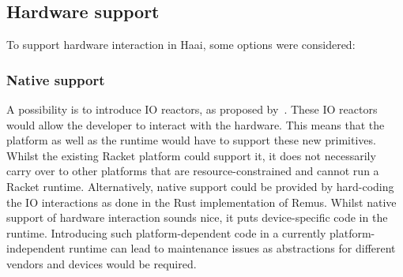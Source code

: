 \documentclass[a4paper]{book}
\begin{document}
\subsection{Hardware support}
\label{sec:hardware-support}
To support hardware interaction in Haai, some options were considered:
\subsubsection{Native support}
A possibility is to introduce IO reactors, as proposed
by~\textcite{oeyen2024reactive}. These IO reactors would allow the developer to
interact with the hardware. This means that the platform as well as the runtime
would have to support these new primitives. Whilst the existing Racket platform
could support it, it does not necessarily carry over to other platforms that are
resource-constrained and cannot run a Racket runtime. Alternatively, native
support could be provided by hard-coding the IO interactions as done in the Rust implementation of Remus.
Whilst native support of hardware interaction sounds nice, it puts
device-specific code in the runtime. Introducing such platform-dependent code in
a currently platform-independent runtime can lead to maintenance issues as
abstractions for different vendors and devices would be required.
\end{document}
